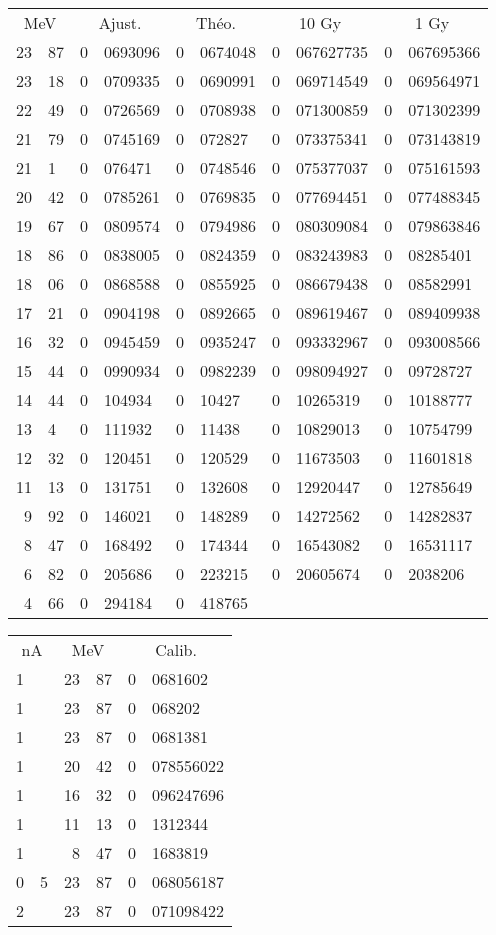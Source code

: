 \documentclass[11pt]{article}
\begin{document}
\begin{center}
\begin{minipage}{.68\linewidth}
\begin{tabular}{r@{.}l|r@{.}lr@{.}lr@{.}lr@{.}l}
\multicolumn{2}{c|}{MeV}&\multicolumn{2}{c}{Ajust.}&\multicolumn{2}{c}{Théo.}&\multicolumn{2}{c}{10 Gy}&\multicolumn{2}{c}{1 Gy}\\
23&87&0&0693096&0&0674048&0&067627735&0&067695366\\
23&18&0&0709335&0&0690991&0&069714549&0&069564971\\
22&49&0&0726569&0&0708938&0&071300859&0&071302399\\
21&79&0&0745169&0&072827&0&073375341&0&073143819\\
21&1&0&076471&0&0748546&0&075377037&0&075161593\\
20&42&0&0785261&0&0769835&0&077694451&0&077488345\\
19&67&0&0809574&0&0794986&0&080309084&0&079863846\\
18&86&0&0838005&0&0824359&0&083243983&0&08285401\\
18&06&0&0868588&0&0855925&0&086679438&0&08582991\\
17&21&0&0904198&0&0892665&0&089619467&0&089409938\\
16&32&0&0945459&0&0935247&0&093332967&0&093008566\\
15&44&0&0990934&0&0982239&0&098094927&0&09728727\\
14&44&0&104934&0&10427&0&10265319&0&10188777\\
13&4&0&111932&0&11438&0&10829013&0&10754799\\
12&32&0&120451&0&120529&0&11673503&0&11601818\\
11&13&0&131751&0&132608&0&12920447&0&12785649\\
9&92&0&146021&0&148289&0&14272562&0&14282837\\
8&47&0&168492&0&174344&0&16543082&0&16531117\\
6&82&0&205686&0&223215&0&20605674&0&2038206\\
4&66&0&294184&0&418765
\end{tabular}
\end{minipage}
\hfill
\begin{minipage}{.31\linewidth}
\begin{tabular}{r@{.}lr@{.}l|r@{.}l}
\multicolumn{2}{c}{nA}&\multicolumn{2}{c|}{MeV}&\multicolumn{2}{c}{Calib.}\\
1&&23&87&0&0681602\\
1&&23&87&0&068202\\
1&&23&87&0&0681381\\
1&&20&42&0&078556022\\
1&&16&32&0&096247696\\
1&&11&13&0&1312344\\
1&&8&47&0&1683819\\
0&5&23&87&0&068056187\\
2&&23&87&0&071098422
\end{tabular}
\vspace{5.2cm}
\end{minipage}
\end{center}
\end{document}
